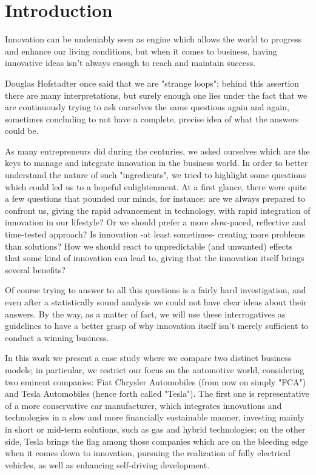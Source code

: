 \section{Introduction}

Innovation can be undeniably seen as engine which allows the world to progress and enhance our living conditions, but when it comes to business, having innovative ideas isn't always enough to reach and maintain success.

Douglas Hofstadter once said that we are "strange loops"; behind this assertion there are many interpretations, but surely enough one lies under the fact that we are continuously trying to ask ourselves the same questions again and again, sometimes concluding to not have a complete, precise idea of what the answers could be.

As many entrepreneurs did during the centuries, we asked ourselves which are the keys to manage and integrate innovation in the business world. In order to better understand the nature of such "ingredients", we tried to highlight some questions which could led us to a hopeful enlightenment. At a first glance, there were quite a few questions that pounded our minds, for instance: are we always prepared to confront us, giving the rapid advancement in technology, with rapid integration of innovation in our lifestyle? Or we should prefer a more slow-paced, reflective and time-tested approach? Is innovation -at least sometimes- creating more problems than solutions?
How we should react to unpredictable (and unwanted) effects that some kind of innovation can lead to, giving that the innovation itself brings several benefits?

Of course trying to answer to all this questions is a fairly hard investigation, and even after a statistically sound analysis we could not have clear ideas about their answers. By the way, as a matter of fact, we will use these interrogatives as guidelines to have a better grasp of why innovation itself isn't merely sufficient to conduct a winning business.

In this work we present a case study where we compare two distinct business models; in particular, we restrict our focus on the automotive world, considering two eminent companies: Fiat Chrysler Automobiles (from now on simply "FCA") and Tesla Automobiles (hence forth called "Tesla"). The first one is representative of a more conservative car manufacturer, which integrates innovations and technologies in a slow and more financially sustainable manner, investing mainly in short or mid-term solutions, such as gas and hybrid technologies; on the other side, Tesla brings the flag among those companies which are on the bleeding edge when it comes down to innovation, pursuing the realization of fully electrical vehicles, as well as enhancing self-driving development.

